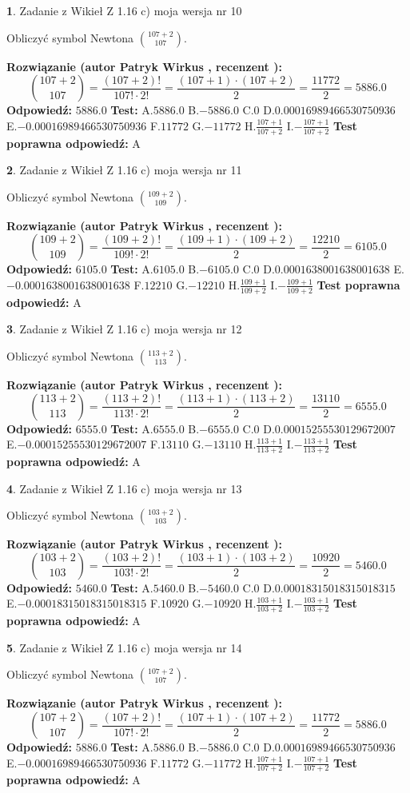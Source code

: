\documentclass[12pt, a4paper]{article}
\theoremstyle{definition} %
\newtheorem{zad}{}
\newcommand{\zadStart}[1]{\begin{zad}#1\newline}
\newcommand{\zadStop}{\end{zad}}
\newcommand{\rozwStart}[2]{\noindent \textbf{Rozwiązanie (autor #1 , recenzent #2): }\newline}
\newcommand{\rozwStop}{\newline}
\newcommand{\odpStart}{\noindent \textbf{Odpowiedź:}\newline}
\newcommand{\odpStop}{\newline}
\newcommand{\testStart}{\noindent \textbf{Test:}\newline}
\newcommand{\testStop}{\newline}
\newcommand{\kluczStart}{\noindent \textbf{Test poprawna odpowiedź:}\newline}
\newcommand{\kluczStop}{\newline}
\begin{document}
\zadStart{Zadanie z Wikieł Z 1.16 c) moja wersja nr 10}

Obliczyć symbol Newtona ${107+2 \choose 107}$.
\zadStop
\rozwStart{Patryk Wirkus}{}
$${107+2 \choose 107} = \frac{(107+2)!}{107! \cdot 2!} = \frac{(107+1)\cdot(107+2)}{2} = \frac{11772}{2} = 5886.0$$
\rozwStop
\odpStart
$5886.0$
\odpStop
\testStart
A.$5886.0$ B.$-5886.0$ C.$0$ D.$0.00016989466530750936$ E.$-0.00016989466530750936$
F.$11772$ G.$-11772$
H.$\frac{107+1}{107+2}$
I.$-\frac{107+1}{107+2}$
\testStop
\kluczStart
A
\kluczStop



\zadStart{Zadanie z Wikieł Z 1.16 c) moja wersja nr 11}

Obliczyć symbol Newtona ${109+2 \choose 109}$.
\zadStop
\rozwStart{Patryk Wirkus}{}
$${109+2 \choose 109} = \frac{(109+2)!}{109! \cdot 2!} = \frac{(109+1)\cdot(109+2)}{2} = \frac{12210}{2} = 6105.0$$
\rozwStop
\odpStart
$6105.0$
\odpStop
\testStart
A.$6105.0$ B.$-6105.0$ C.$0$ D.$0.0001638001638001638$ E.$-0.0001638001638001638$
F.$12210$ G.$-12210$
H.$\frac{109+1}{109+2}$
I.$-\frac{109+1}{109+2}$
\testStop
\kluczStart
A
\kluczStop



\zadStart{Zadanie z Wikieł Z 1.16 c) moja wersja nr 12}

Obliczyć symbol Newtona ${113+2 \choose 113}$.
\zadStop
\rozwStart{Patryk Wirkus}{}
$${113+2 \choose 113} = \frac{(113+2)!}{113! \cdot 2!} = \frac{(113+1)\cdot(113+2)}{2} = \frac{13110}{2} = 6555.0$$
\rozwStop
\odpStart
$6555.0$
\odpStop
\testStart
A.$6555.0$ B.$-6555.0$ C.$0$ D.$0.00015255530129672007$ E.$-0.00015255530129672007$
F.$13110$ G.$-13110$
H.$\frac{113+1}{113+2}$
I.$-\frac{113+1}{113+2}$
\testStop
\kluczStart
A
\kluczStop



\zadStart{Zadanie z Wikieł Z 1.16 c) moja wersja nr 13}

Obliczyć symbol Newtona ${103+2 \choose 103}$.
\zadStop
\rozwStart{Patryk Wirkus}{}
$${103+2 \choose 103} = \frac{(103+2)!}{103! \cdot 2!} = \frac{(103+1)\cdot(103+2)}{2} = \frac{10920}{2} = 5460.0$$
\rozwStop
\odpStart
$5460.0$
\odpStop
\testStart
A.$5460.0$ B.$-5460.0$ C.$0$ D.$0.00018315018315018315$ E.$-0.00018315018315018315$
F.$10920$ G.$-10920$
H.$\frac{103+1}{103+2}$
I.$-\frac{103+1}{103+2}$
\testStop
\kluczStart
A
\kluczStop



\zadStart{Zadanie z Wikieł Z 1.16 c) moja wersja nr 14}

Obliczyć symbol Newtona ${107+2 \choose 107}$.
\zadStop
\rozwStart{Patryk Wirkus}{}
$${107+2 \choose 107} = \frac{(107+2)!}{107! \cdot 2!} = \frac{(107+1)\cdot(107+2)}{2} = \frac{11772}{2} = 5886.0$$
\rozwStop
\odpStart
$5886.0$
\odpStop
\testStart
A.$5886.0$ B.$-5886.0$ C.$0$ D.$0.00016989466530750936$ E.$-0.00016989466530750936$
F.$11772$ G.$-11772$
H.$\frac{107+1}{107+2}$
I.$-\frac{107+1}{107+2}$
\testStop
\kluczStart
A
\kluczStop
\end{document}
